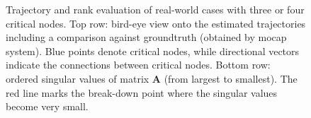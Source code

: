 \documentclass[letterpaper, 10 pt, conference]{ieeeconf}  %
\begin{document}
\begin{figure}[t]
{    }%

\centering
\caption{Trajectory and rank evaluation of real-world cases with three or four critical nodes. Top row: bird-eye view onto the estimated trajectories including a comparison against groundtruth (obtained by mocap system). Blue points denote critical nodes, while directional vectors indicate the connections between critical nodes. Bottom row: ordered singular values of matrix $\mathbf{A}$ (from largest to smallest). The red line marks the break-down point where the singular values become very small.}
\label{fig:traj_and_rank}
\end{figure}
\end{document}

